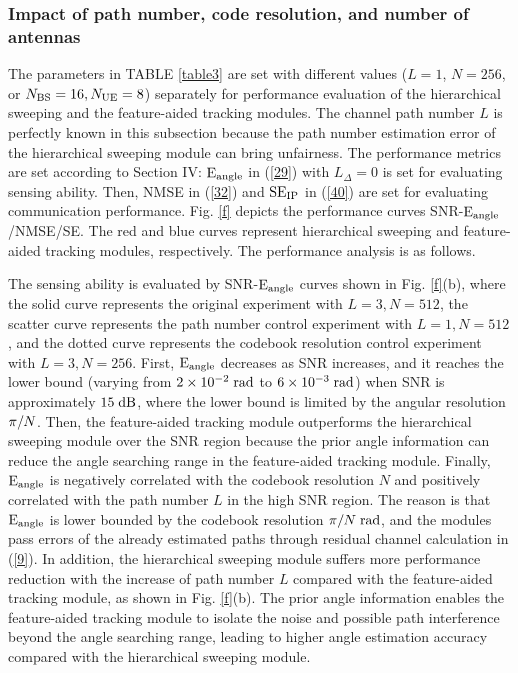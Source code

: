 \documentclass[journal,12pt,onecolumn,draftclsnofoot,]{IEEEtran}
\begin{document}
\subsubsection{Impact of path number, code resolution, and number of antennas}
The parameters in TABLE \ref{table3} are set with different values ($L=1$, $N=256$, or $N_{\rm BS}=16,N_{\rm UE}=8$) separately for performance evaluation of the hierarchical sweeping and the feature-aided tracking modules. 
The channel path number $L$ is perfectly known in this subsection because the path number estimation error of the hierarchical sweeping module can bring unfairness. 
The performance metrics are set according to Section IV: ${{\rm{E}}_{{\rm{angle}}}}$ in (\ref{29}) with $L_{\Delta}=0$ is set for evaluating sensing ability. Then, NMSE in (\ref{32}) and ${\rm{S}}{{\rm{E}}_{{\rm{IP}}}}$ in (\ref{40}) are set for evaluating communication performance. 
Fig. \ref{f} depicts the performance curves SNR-${{\rm{E}}_{{\rm{angle}}}}$/NMSE/SE. 
The red and blue curves represent hierarchical sweeping and feature-aided tracking modules, respectively. The performance analysis is as follows.

The sensing ability is evaluated by SNR-${{\rm{E}}_{{\rm{angle}}}}$ curves shown in Fig. \ref{f}(b), where the solid curve represents the original experiment with $L=3,N=512$, the scatter curve represents the path number control experiment with $L=1,N=512$, and the dotted curve represents the codebook resolution control experiment with $L=3,N=256$. 
{\color{black}First, ${{\rm{E}}_{{\rm{angle}}}}$ decreases as SNR increases, and it reaches the lower bound (varying from $2\times 10^{-2}\;{\rm rad}$ to $6\times 10^{-3}\;{\rm rad}$) when SNR is approximately $15\;{\rm dB}$, where the lower bound is limited by the angular resolution ${\rm{\pi }}/N$.}
Then, the feature-aided tracking module outperforms the hierarchical sweeping module over the SNR region because the prior angle information can reduce the angle searching range in the feature-aided tracking module. 
Finally, ${{\rm{E}}_{{\rm{angle}}}}$ is negatively correlated with the codebook resolution $N$ and positively correlated with the path number $L$ in the high SNR region. 
The reason is that ${{\rm{E}}_{{\rm{angle}}}}$ is lower bounded by the codebook resolution ${\pi }/{{N}}\;{\rm rad}$, and the modules pass errors of the already estimated paths through residual channel calculation in (\ref{9}). 
In addition, the hierarchical sweeping module suffers more performance reduction with the increase of path number $L$ compared with the feature-aided tracking module, as shown in Fig. \ref{f}(b). 
The prior angle information enables the feature-aided tracking module to isolate the noise and possible path interference beyond the angle searching range, leading to higher angle estimation accuracy compared with the hierarchical sweeping module.
\end{document}
